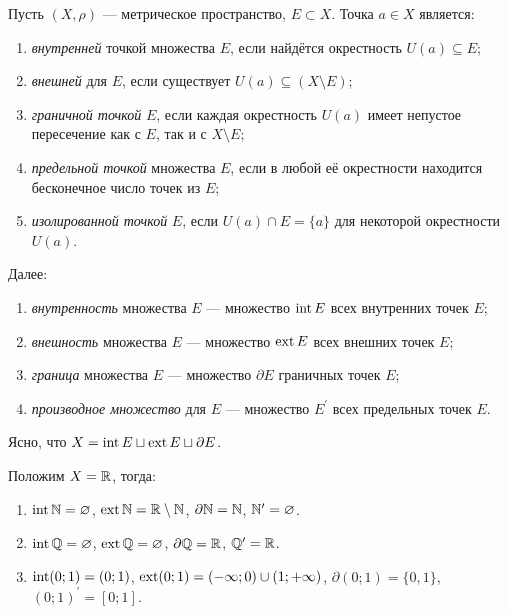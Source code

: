 \begin{definition}
    Пусть $(X, \rho)$ --- метрическое пространство, $E \subset X$. Точка $a \in X$ является:
    \begin{enumerate}[nolistsep]
        \item \textit{внутренней} точкой множества $E$, если найдётся окрестность $U(a) \subseteq E$;
        \item \textit{внешней} для $E$, если существует $U(a) \subseteq (X \setminus E)$;
        \item \textit{граничной точкой} $E$, если каждая окрестность $U(a)$ имеет непустое пересечение как с $E$, так и с $X \setminus E$;
        \item \textit{предельной точкой} множества $E$, если в любой её окрестности находится бесконечное число точек из $E$;
        \item \textit{изолированной точкой} $E$, если $U(a) \cap E = \{a\}$ для некоторой окрестности $U(a)$.
    \end{enumerate}

    Далее:
    \begin{enumerate}[nolistsep]
        \item \textit{внутренность} множества $E$ --- множество $\operatorname{int} E$ всех внутренних точек $E$;
        \item \textit{внешность} множества $E$ --- множество $\operatorname{ext} E$ всех внешних точек $E$;
        \item \textit{граница} множества $E$ --- множество $\partial E$ граничных точек $E$;
        \item \textit{производное множество} для $E$ --- множество $E^\prime$ всех предельных точек $E$.
    \end{enumerate}
\end{definition}

Ясно, что $X = \operatorname{int} E \sqcup \operatorname{ext} E \sqcup \partial E$.

\begin{example}
    Положим $X = \mathbb{R}$, тогда:
    \begin{enumerate}[nolistsep]
        \item $\operatorname{int}\mathbb{N} = \varnothing$, $\operatorname{ext}\mathbb{N} = \mathbb{R} \setminus \mathbb{N}$, $\partial\mathbb{N} = \mathbb{N}$, $\mathbb{N}^\prime = \varnothing$.
        \item $\operatorname{int}\mathbb{Q} = \varnothing$, $\operatorname{ext}\mathbb{Q} = \varnothing$, $\partial\mathbb{Q} = \mathbb{R}$, $\mathbb{Q}^\prime = \mathbb{R}$.
        \item $\operatorname{int}(0; 1) = (0; 1)$, $\operatorname{ext}(0; 1) = (-\infty; 0) \cup (1; +\infty)$, $\partial(0; 1) = \{0, 1\}$, $(0; 1)^\prime = [0; 1]$.
    \end{enumerate}
\end{example}

